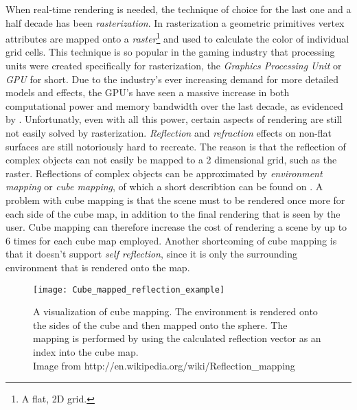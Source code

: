 When real-time rendering is needed, the technique of choice for the last one and
a half decade has been \textit{rasterization}. In rasterization a geometric
primitives vertex attributes are mapped onto a \textit{raster}\footnote{A flat,
  2D grid.} and used to calculate the color of individual grid cells. This
technique is so popular in the gaming industry that processing units were
created specifically for rasterization, the \textit{Graphics Processing Unit} or
\textit{GPU} for short. Due to the industry's ever increasing demand for more
detailed models and effects, the GPU's have seen a massive increase in both
computational power and memory bandwidth over the last decade, as evidenced by
. Unfortunatly, even with all this power, certain
aspects of rendering are still not easily solved by
rasterization. \textit{Reflection} and \textit{refraction} effects on non-flat
surfaces are still notoriously hard to recreate. The reason is that the
reflection of complex objects can not easily be mapped to a 2 dimensional grid,
such as the raster. Reflections of complex objects can be approximated by
\textit{environment mapping} or \textit{cube mapping}, of which a short
describtion can be found on . A problem with cube mapping is
that the scene must to be rendered once more for each side of the cube map, in
addition to the final rendering that is seen by the user. Cube mapping can
therefore increase the cost of rendering a scene by up to 6 times for each cube
map employed. Another shortcoming of cube mapping is that it doesn't support
\textit{self reflection}, since it is only the surrounding environment that is
rendered onto the map.

\begin{figure}
  \centering
  \texttt{[image: Cube\_mapped\_reflection\_example]}

  \vspace{3mm}
  \parbox{9.5cm}{\caption[Cube mapping visualized.]{A visualization of cube
      mapping. The environment is rendered onto the sides of the cube and then
      mapped onto the sphere. The mapping is performed by using the calculated
      reflection vector as an index into the cube map.\\Image from
      http://en.wikipedia.org/wiki/Reflection\_mapping}\label{fig:cubemap}}
\end{figure}


